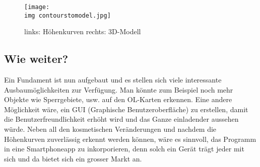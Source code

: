 \begin{figure}[hbt]
	\centering
	\texttt{[image: \\img contourstomodel.jpg]}
	\caption{links: Höhenkurven rechts: 3D-Modell}
	\label{fig:courvecompare}
\end{figure}

\subsection{Wie weiter?}

Ein Fundament ist nun aufgebaut und es stellen sich viele interessante Ausbaumöglichkeiten zur Verfügung. Man könnte zum Beispiel noch mehr Objekte wie Sperrgebiete, usw. auf den OL-Karten erkennen. Eine andere Möglichkeit wäre, ein GUI (Graphische Benutzeroberfläche) zu erstellen, damit die Benutzerfreundlichkeit erhöht wird und das Ganze einladender aussehen würde. Neben all den kosmetischen Veränderungen und nachdem die Höhenkurven zuverlässig erkennt werden können, wäre es sinnvoll, das Programm in eine Smartphoneapp zu inkorporieren, denn solch ein Gerät trägt jeder mit sich und da bietet sich ein grosser Markt an.
